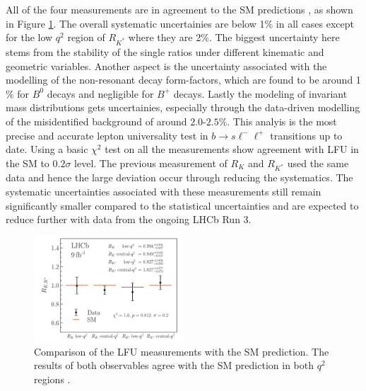 \documentclass[%
 reprint,
 amsmath,amssymb,
 aps,
]{revtex4-2}
\begin{document}
All of the four measurements are in agreement to the SM predictions \cite{lhcbcollaboration2022measurement,Bobeth_2007}, as shown in Figure \ref{fig:5}. 
The overall systematic uncertainies are below 1$\%$ in all cases except for the low $q^2$ region of $R_{K^*}$ where they are 2$\%$.
The biggest uncertainty here stems from the stability of the single ratios under different kinematic and geometric variables. Another aspect
is the uncertainty associated with the modelling of the non-resonant decay form-factors, which are found to be around 1$\%$ for $B^0$ decays and negligible 
for $B^+$ decays. Lastly the modeling of invariant mass distributions gets uncertainies, especially through the data-driven modelling of the misidentified background
of around $2.0$-$2.5\%$.
This analyis is the most precise and accurate lepton universality test in $b \rightarrow s {\ell}^{-} {\ell}^{+}$ transitions up to date. Using a basic $\chi^2$ test on all the measurements 
show agreement with LFU in the SM to $0.2\sigma$ level. The previous measurement of $R_K$ and $R_{K^*}$ used the same data and hence the large deviation occur 
through reducing the systematics. The systematic uncertainties associated
with these measurements still remain significantly smaller compared to the statistical uncertainties
and are expected to reduce further with data from the ongoing LHCb Run 3. 
\begin{figure}[h!]
    \centering
    \includegraphics[width=0.5\textwidth]{fit.png}
    \caption{Comparison of the LFU measurements with the SM prediction. The results of
    both observables agree with the
    SM prediction in both $q^2$ regions \cite{lhcbcollaboration2022measurement}.}
    \label{fig:5}
\end{figure}
 
\end{document}
